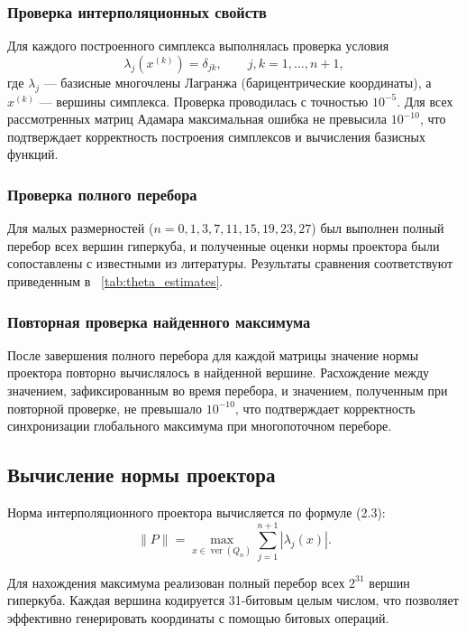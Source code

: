 \documentclass[a4paper,12pt]{article}
\theoremstyle{indented}
\begin{document}
\subsubsection{Проверка интерполяционных свойств}

Для каждого построенного симплекса выполнялась проверка условия
\[
\lambda_j(x^{(k)}) = \delta_{jk}, \qquad j,k = 1,\dots,n+1,
\]
где $\lambda_j$ — базисные многочлены Лагранжа (барицентрические координаты), а $x^{(k)}$ — вершины симплекса. Проверка проводилась с точностью $10^{-5}$. Для всех рассмотренных матриц Адамара максимальная ошибка не превысила $10^{-10}$, что подтверждает корректность построения симплексов и вычисления базисных функций.

\subsubsection{Проверка полного перебора}

Для малых размерностей ($n = 0, 1, 3, 7, 11, 15, 19, 23, 27$) был выполнен полный перебор всех вершин гиперкуба, и полученные оценки нормы проектора были сопоставлены с известными из литературы. Результаты сравнения соответствуют приведенным в ~\ref{tab:theta_estimates}.

\subsubsection{Повторная проверка найденного максимума}

После завершения полного перебора для каждой матрицы значение нормы проектора повторно вычислялось в найденной вершине. Расхождение между значением, зафиксированным во время перебора, и значением, полученным при повторной проверке, не превышало $10^{-10}$, что подтверждает корректность синхронизации глобального максимума при многопоточном переборе.

\subsection{Вычисление нормы проектора}

Норма интерполяционного проектора вычисляется по формуле (2.3):
\[
\|P\| = \max_{x \in \operatorname{ver}(Q_n)} \sum_{j=1}^{n+1} |\lambda_j(x)|.
\]

Для нахождения максимума реализован полный перебор всех $2^{31}$ вершин гиперкуба. Каждая вершина кодируется 31-битовым целым числом, что позволяет эффективно генерировать координаты с помощью битовых операций.
\end{document}

